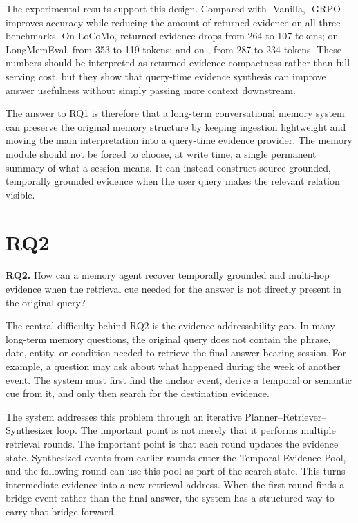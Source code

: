 The experimental results support this design. Compared with
\sys{}-Vanilla, \sys{}-GRPO improves accuracy while reducing the amount of
returned evidence on all three benchmarks. On LoCoMo, returned evidence drops
from 264 to 107 tokens; on LongMemEval, from 353 to 119 tokens; and on
\bench{}, from 287 to 234 tokens. These numbers should be interpreted as
returned-evidence compactness rather than full serving cost, but they show that
query-time evidence synthesis can improve answer usefulness without simply
passing more context downstream.

The answer to RQ1 is therefore that a long-term conversational memory system can
preserve the original memory structure by keeping ingestion lightweight and
moving the main interpretation into a query-time evidence provider. The memory
module should not be forced to choose, at write time, a single permanent
summary of what a session means. It can instead construct source-grounded,
temporally grounded evidence when the user query makes the relevant relation
visible.

\section{RQ2}
\label{sec:conclusion-rq2}

\textbf{RQ2.} How can a memory agent recover temporally grounded and multi-hop
evidence when the retrieval cue needed for the answer is not directly present
in the original query?

The central difficulty behind RQ2 is the evidence addressability gap. In many
long-term memory questions, the original query does not contain the phrase,
date, entity, or condition needed to retrieve the final answer-bearing session.
For example, a question may ask about what happened during the week of another
event. The system must first find the anchor event, derive a temporal or
semantic cue from it, and only then search for the destination evidence.

The system addresses this problem through an iterative
Planner--Retriever--Synthesizer loop. The important point is not merely that it
performs multiple retrieval rounds. The important point is that each round
updates the evidence state. Synthesized events from earlier rounds enter the
Temporal Evidence Pool, and the following round can use this pool as part of
the search state. This turns intermediate evidence into a new retrieval
address. When the first round finds a bridge event rather than the final
answer, the system has a structured way to carry that bridge forward.

